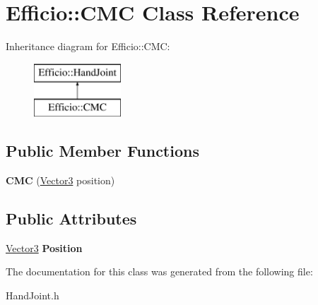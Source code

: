 \hypertarget{class_efficio_1_1_c_m_c}{}\section{Efficio\+:\+:C\+MC Class Reference}
\label{class_efficio_1_1_c_m_c}
Inheritance diagram for Efficio\+:\+:C\+MC\+:\begin{figure}[H]
\begin{center}
\leavevmode
\includegraphics[height=2.000000cm]{class_efficio_1_1_c_m_c}
\end{center}
\end{figure}
\subsection*{Public Member Functions}
\begin{DoxyCompactItemize}
\item 
{\bfseries C\+MC} (\hyperlink{class_efficio_1_1_vector3}{Vector3} position)\hypertarget{class_efficio_1_1_c_m_c_a9910bf1a2e57d408a7fbe45db8f11221}{}\label{class_efficio_1_1_c_m_c_a9910bf1a2e57d408a7fbe45db8f11221}

\end{DoxyCompactItemize}
\subsection*{Public Attributes}
\begin{DoxyCompactItemize}
\item 
\hyperlink{class_efficio_1_1_vector3}{Vector3} {\bfseries Position}\hypertarget{class_efficio_1_1_c_m_c_a7fc6f6e48c69861a9f9acdf2c4411c39}{}\label{class_efficio_1_1_c_m_c_a7fc6f6e48c69861a9f9acdf2c4411c39}

\end{DoxyCompactItemize}


The documentation for this class was generated from the following file\+:\begin{DoxyCompactItemize}
\item 
Hand\+Joint.\+h\end{DoxyCompactItemize}
